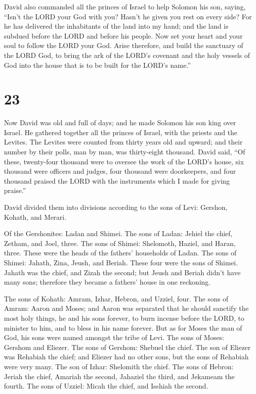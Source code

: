  David also commanded all the princes of Israel to help
Solomon his son, saying,  ``Isn't the LORD your God with
you? Hasn't he given you rest on every side? For he has delivered the
inhabitants of the land into my hand; and the land is subdued before the
LORD and before his people.  Now set your heart and your
soul to follow the LORD your God. Arise therefore, and build the
sanctuary of the LORD God, to bring the ark of the LORD's covenant and
the holy vessels of God into the house that is to be built for the
LORD's name.''

\hypertarget{section-22}{%
\section{23}\label{section-22}}

 Now David was old and full of days; and he made Solomon
his son king over Israel.  He gathered together all the
princes of Israel, with the priests and the Levites.  The
Levites were counted from thirty years old and upward; and their number
by their polls, man by man, was thirty-eight thousand. 
David said, ``Of these, twenty-four thousand were to oversee the work of
the LORD's house, six thousand were officers and judges, 
four thousand were doorkeepers, and four thousand praised the LORD with
the instruments which I made for giving praise.''

 David divided them into divisions according to the sons
of Levi: Gershon, Kohath, and Merari.

 Of the Gershonites: Ladan and Shimei.  The
sons of Ladan: Jehiel the chief, Zetham, and Joel, three. 
The sons of Shimei: Shelomoth, Haziel, and Haran, three. These were the
heads of the fathers' households of Ladan.  The sons of
Shimei: Jahath, Zina, Jeush, and Beriah. These four were the sons of
Shimei.  Jahath was the chief, and Zizah the second; but
Jeush and Beriah didn't have many sons; therefore they became a fathers'
house in one reckoning.

 The sons of Kohath: Amram, Izhar, Hebron, and Uzziel,
four.  The sons of Amram: Aaron and Moses; and Aaron was
separated that he should sanctify the most holy things, he and his sons
forever, to burn incense before the LORD, to minister to him, and to
bless in his name forever.  But as for Moses the man of
God, his sons were named amongst the tribe of Levi.  The
sons of Moses: Gershom and Eliezer.  The sons of Gershom:
Shebuel the chief.  The son of Eliezer was Rehabiah the
chief; and Eliezer had no other sons, but the sons of Rehabiah were very
many.  The son of Izhar: Shelomith the chief.
 The sons of Hebron: Jeriah the chief, Amariah the
second, Jahaziel the third, and Jekameam the fourth.  The
sons of Uzziel: Micah the chief, and Isshiah the second.

